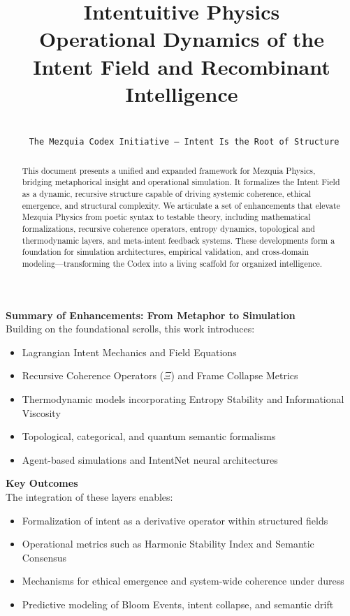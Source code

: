 \documentclass[12pt]{article}
\title{Intentuitive Physics \\ Operational Dynamics of the Intent Field and Recombinant Intelligence}
\author{\\ \texttt{\textcopyright{} The Mezquia Codex Initiative -- Intent Is the Root of Structure}}
\date{}
\begin{document}
\maketitle

\begin{abstract}
This document presents a unified and expanded framework for Mezquia Physics, bridging metaphorical insight and operational simulation. It formalizes the Intent Field as a dynamic, recursive structure capable of driving systemic coherence, ethical emergence, and structural complexity. We articulate a set of enhancements that elevate Mezquia Physics from poetic syntax to testable theory, including mathematical formalizations, recursive coherence operators, entropy dynamics, topological and thermodynamic layers, and meta-intent feedback systems. These developments form a foundation for simulation architectures, empirical validation, and cross-domain modeling—transforming the Codex into a living scaffold for organized intelligence.
\end{abstract}

\textbf{Summary of Enhancements: From Metaphor to Simulation} \\
Building on the foundational scrolls, this work introduces:
\begin{itemize}
  \item Lagrangian Intent Mechanics and Field Equations
  \item Recursive Coherence Operators (\(\Xi\)) and Frame Collapse Metrics
  \item Thermodynamic models incorporating Entropy Stability and Informational Viscosity
  \item Topological, categorical, and quantum semantic formalisms
  \item Agent-based simulations and IntentNet neural architectures
\end{itemize}

\textbf{Key Outcomes} \\
The integration of these layers enables:
\begin{itemize}
  \item Formalization of intent as a derivative operator within structured fields
  \item Operational metrics such as Harmonic Stability Index and Semantic Consensus
  \item Mechanisms for ethical emergence and system-wide coherence under duress
  \item Predictive modeling of Bloom Events, intent collapse, and semantic drift
\end{itemize}
\end{document}
